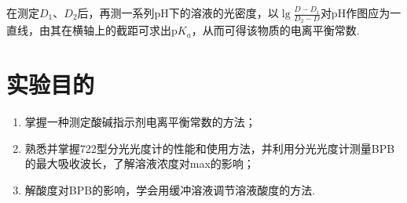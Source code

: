 在测定$D_1$、$D_2$后，再测一系列pH下的溶液的光密度，以$\lg\frac{D-D_1}{D_2-D}$对pH作图应为一直线，由其在横轴上的截距可求出p$K_a$，从而可得该物质的电离平衡常数.~

\section{实验目的}
\begin{enumerate}
  \item 掌握一种测定酸碱指示剂电离平衡常数的方法；
  \item 熟悉并掌握722型分光光度计的性能和使用方法，并利用分光光度计测量BPB的最大吸收波长，了解溶液浓度对max的影响；
  \item 解酸度对BPB的影响，学会用缓冲溶液调节溶液酸度的方法.~
\end{enumerate}
